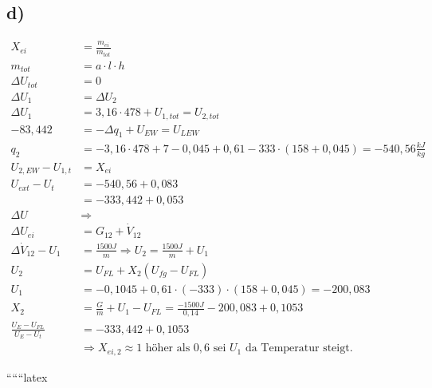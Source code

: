 

\subsection*{d)}

\begin{align*}
    X_{ei} &= \frac{m_{ei}}{m_{tot}} \\
    m_{tot} &= a \cdot l \cdot h \\
    \Delta U_{tot} &= 0 \\
    \Delta U_{1} &= \Delta U_{2} \\
    \Delta U_{1} &= 3,16 \cdot 478 + U_{1,tot} = U_{2,tot} \\
    - 83,442 &= - \Delta q_{1} + U_{EW} = U_{LEW} \\
    q_{2} &= -3,16 \cdot 478 + 7 - 0,045 + 0,61 - 333 \cdot (158 + 0,045) = - 540,56 \frac{kJ}{kg} \\
    U_{2,EW} - U_{1,t} &= X_{ei} \\
    U_{ext} - U_{t} &= - 540,56 + 0,083 \\
    &= - 333,442 + 0,053 \\
    \Delta U &\Rightarrow \\
    \Delta U_{ei} &= G_{12} + \dot{V}_{12} \\
    \Delta \dot{V}_{12} - U_{1} &= \frac{1500J}{m} \Rightarrow U_{2} = \frac{1500J}{m} + U_{1} \\
    U_{2} &= U_{FL} + X_{2} (U_{fg} - U_{FL}) \\
    U_{1} &= - 0,1045 + 0,61 \cdot (-333) \cdot (158 + 0,045) = - 200,083 \\
    X_{2} &= \frac{G}{m} + U_{1} - U_{FL} = \frac{- 1500J}{0,14} - 200,083 + 0,1053 \\
    \frac{U_{E} - U_{FL}}{U_{E} - U_{t}} &= - 333,442 + 0,1053 \\
    &\Rightarrow X_{ei,2} \approx 1 \text{ höher als } 0,6 \text{ sei } U_{1} \text{ da Temperatur steigt.}
\end{align*}

``````latex